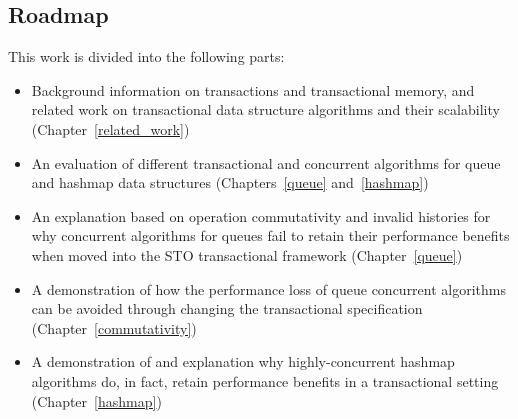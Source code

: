 \subsection{Roadmap}
This work is divided into the following parts: 
\begin{itemize}
    \item Background information on transactions and transactional memory, and related work on transactional data structure algorithms and their scalability (Chapter~\ref{related_work})
    \item An evaluation of different transactional and concurrent algorithms for queue and hashmap data structures (Chapters~\ref{queue} and~\ref{hashmap})
    \item An explanation based on operation commutativity and invalid histories for why concurrent algorithms for queues fail to retain their performance benefits when moved into the STO transactional framework (Chapter~\ref{queue})
    \item A demonstration of how the performance loss of queue concurrent algorithms can be avoided through changing the transactional specification (Chapter~\ref{commutativity})
    \item A demonstration of and explanation why highly-concurrent hashmap algorithms do, in fact, retain performance benefits in a transactional setting (Chapter~\ref{hashmap})
\end{itemize}
